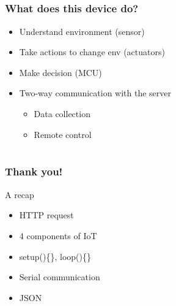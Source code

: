 \documentclass[compress, aspectratio=32]{beamer}
\begin{document}
\subsection*{}
\begin{frame}
    \frametitle{What does this device do?}
    \begin{itemize}
        \item Understand environment (sensor)
        \item Take actions to change env (actuators)
        \item Make decision (MCU)
        \item Two-way communication with the server
        \begin{itemize}
            \item Data collection
            \item Remote control
        \end{itemize}
    \end{itemize}
\end{frame}

\section*{}
\begin{frame}
    \frametitle{Thank you!}
    A recap
    \begin{itemize}
        \item HTTP request
        \item 4 components of IoT
        \item setup()\{\}, loop()\{\}
        \item Serial communication
        \item JSON 
    \end{itemize}
\end{frame}
\end{document}
